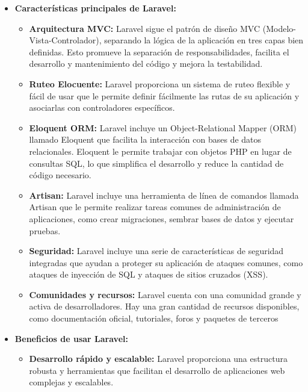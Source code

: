 \begin{itemize}
    \item \textbf{Características principales de Laravel:}
    \begin{itemize}

    \item \textbf{Arquitectura MVC:} Laravel sigue el patrón de diseño MVC (Modelo-Vista-Controlador), separando la lógica de la aplicación en tres capas bien definidas. Esto promueve la separación de responsabilidades, facilita el desarrollo y mantenimiento del código y mejora la testabilidad.

    \item \textbf{Ruteo Elocuente:} Laravel proporciona un sistema de ruteo flexible y fácil de usar que le permite definir fácilmente las rutas de su aplicación y asociarlas con controladores específicos.

    \item \textbf{Eloquent ORM:} Laravel incluye un Object-Relational Mapper (ORM) llamado Eloquent que facilita la interacción con bases de datos relacionales. Eloquent le permite trabajar con objetos PHP en lugar de consultas SQL, lo que simplifica el desarrollo y reduce la cantidad de código necesario.

    \item \textbf{Artisan:} Laravel incluye una herramienta de línea de comandos llamada Artisan que le permite realizar tareas comunes de administración de aplicaciones, como crear migraciones, sembrar bases de datos y ejecutar pruebas.

    \item \textbf{Seguridad:} Laravel incluye una serie de características de seguridad integradas que ayudan a proteger su aplicación de ataques comunes, como ataques de inyección de SQL y ataques de sitios cruzados (XSS).

    \item \textbf{Comunidades y recursos:} Laravel cuenta con una comunidad grande y activa de desarrolladores. Hay una gran cantidad de recursos disponibles, como documentación oficial, tutoriales, foros y paquetes de terceros
    
    \end{itemize}

    \item \textbf{Beneficios de usar Laravel:}
    \begin{itemize}

    \item \textbf{Desarrollo rápido y escalable:} Laravel proporciona una estructura robusta y herramientas que facilitan el desarrollo de aplicaciones web complejas y escalables.
    

\end{itemize}
\end{itemize}
